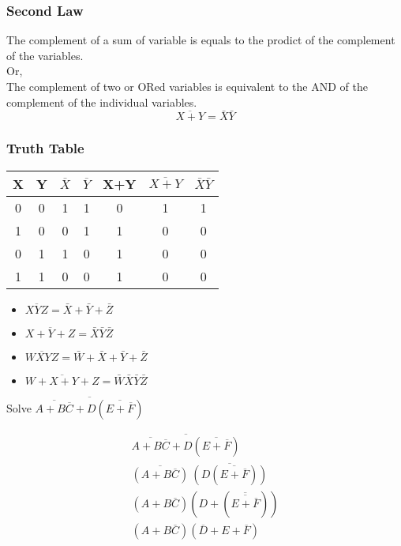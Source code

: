 \subsubsection{Second Law}
The complement of a sum of variable is equals to the prodict of the complement of the variables.
\\
Or,\\
The complement of two or ORed variables is equivalent to the AND of the complement of the individual variables.
\begin{equation}
\overline{X+Y}=\bar{X}\bar{Y}
\end{equation}

\subsubsection{Truth Table}
\renewcommand*{\arraystretch}{1.5}
\begin{tabular}{|c|c|c|c|c|c|c|}
	\hline
	X&Y&$\overline{X}$&$\overline{Y}$&X+Y&$\overline{X+Y}$&$\bar{X}\bar{Y}$\\
	\hline 0&0&1&1&0&1&1\\
	\hline 1&0&0&1&1&0&0\\
	\hline 0&1&1&0&1&0&0\\
	\hline 1&1&0&0&1&0&0\\
	\hline
\end{tabular}
\begin{note}
	\begin{itemize}
		\item $\overline{XYZ}=\bar{X}+\bar{Y}+\bar{Z}$\\
		\item $\overline{X+Y+Z}=\bar{X}\bar{Y}\bar{Z}$\\
		\item $\overline{WXYZ}=\bar{W}+\bar{X}+\bar{Y}+\bar{Z}$\\
		\item $\overline{W+X+Y+Z}=\bar{W}\bar{X}\bar{Y}\bar{Z}$
	\end{itemize}
\end{note}
\begin{exercise}
	Solve \quad $\overline{\overline{A+B\overline{C}}+D(\overline{E+\overline{F}})}$
\end{exercise}
\begin{answer}
	\begin{align*}
	\overline{\overline{A+B\overline{C}}+D(\overline{E+\overline{F}})}\\
	\overline{(A+B\overline{C})}\ \overline{(D(\overline{E+\overline{F}}))}\\
	(A+B\overline{C})(D+(\overline{\overline{E+\overline{F}}}))\\
	(A+B\overline{C})(\overline{D}+E+\overline{F})
	\end{align*}
\end{answer}
